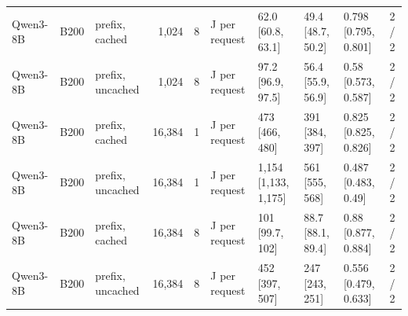 \begin{landscape}
\begin{longtable}{lllrrlllll}
Qwen3-8B & B200 & prefix, cached & 1,024 & 8 & J per request & 62.0 {[}60.8, 63.1{]} & 49.4 {[}48.7, 50.2{]} & 0.798 {[}0.795, 0.801{]} & 2 / 2 \\
Qwen3-8B & B200 & prefix, uncached & 1,024 & 8 & J per request & 97.2 {[}96.9, 97.5{]} & 56.4 {[}55.9, 56.9{]} & 0.58 {[}0.573, 0.587{]} & 2 / 2 \\
Qwen3-8B & B200 & prefix, cached & 16,384 & 1 & J per request & 473 {[}466, 480{]} & 391 {[}384, 397{]} & 0.825 {[}0.825, 0.826{]} & 2 / 2 \\
Qwen3-8B & B200 & prefix, uncached & 16,384 & 1 & J per request & 1,154 {[}1,133, 1,175{]} & 561 {[}555, 568{]} & 0.487 {[}0.483, 0.49{]} & 2 / 2 \\
Qwen3-8B & B200 & prefix, cached & 16,384 & 8 & J per request & 101 {[}99.7, 102{]} & 88.7 {[}88.1, 89.4{]} & 0.88 {[}0.877, 0.884{]} & 2 / 2 \\
Qwen3-8B & B200 & prefix, uncached & 16,384 & 8 & J per request & 452 {[}397, 507{]} & 247 {[}243, 251{]} & 0.556 {[}0.479, 0.633{]} & 2 / 2 \\
\end{longtable}
\endgroup
\end{landscape}
\restoregeometry
